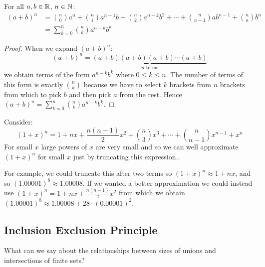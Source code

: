 \documentclass[../main.tex]{subfiles}
\begin{document}
\begin{theorem}
  For all $a, b \in \mathbb{R}$, $n \in \mathbb{N}$: \label{binomialTheorem}
  \begin{align*}
    (a + b)^{n} &= \binom{n}{0}a^{n} + \binom{n}{1}a^{n - 1}b + \binom{n}{2}a^{n-2}b^{2} + \cdots + \binom{n}{n-1}ab^{n-1} + \binom{n}{n}b^{n} \\
                &=\sum_{k=0}^{n} \binom{n}{k}a^{n - k} b^{k}
  \end{align*}
\end{theorem}
\begin{proof}
  When we expand $(a + b)^{n}$:
  \[
    (a+b)^{n} = \underbrace{(a + b)(a + b)(a + b) \cdots (a + b)}_{n \text{ terms}}
  \]
  we obtain terms of the form $a^{n - k}b^{k}$ where $0 \leq k \leq n$.
  The number of terms of this form is exactly $\binom{n}{k}$ because we have to select $k$ brackets from $n$ brackets from which to pick $b$ and then pick $a$ from the rest.
  Hence $(a + b)^{n} = \sum_{k=0}^{n} \binom{n}{k}a^{n - k}b^{k}$.
\end{proof}
\begin{example}
  Consider:
  \[
    (1 + x)^{n} = 1 + nx + \frac{n(n-1)}{2}x^2 + \binom{n}{3}x^3 + \cdots + \binom{n}{n-1}x^{n-1} + x^{n}
  \]
  For small $x$ large powers of $x$ are very small and so we can well approximate $(1 + x)^{n}$ for small $x$ just by truncating this expression..

  For example, we could truncate this after two terms so $(1 + x)^{n} \approx 1 + nx$, and so $(1.00001)^{8} \approx 1.00008$.
  If we wanted a better approximation we could instead use $(1 + x)^{n} = 1 + nx + \frac{n(n-1)}{2}x^2$ from which we obtain $(1.00001)^{8} \approx 1.00008 + 28 \cdot (0.00001)^{2}$.
\end{example}
\subsection{Inclusion Exclusion Principle}
What can we say about the relationships between sizes of unions and intersections of finite sets?
\end{document}
